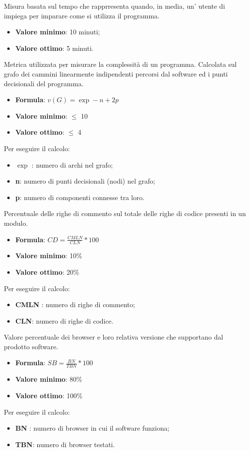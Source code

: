 Misura basata sul tempo che rapprresenta quando, in media, un' utente di impiega per imparare come si utilizza il programma.
\begin{itemize}
    \item \textbf{Valore minimo}: 10 minuti;
    \item \textbf{Valore ottimo}: 5 minuti.
\end{itemize}  

Metrica utilizzata per misurare la complessità di un programma. Calcolata sul grafo dei cammini linearmente indipendenti percorsi dal software ed i punti decisionali del programma.
\begin{itemize}
    \item \textbf{Formula}: $v(G)=\exp-n+2p$
    \item \textbf{Valore minimo}: $\leq$ 10
    \item \textbf{Valore ottimo}: $\leq$ 4
\end{itemize}  
Per eseguire il calcolo:
\begin{itemize}
    \item \textbf{$\exp$} : numero di archi nel grafo;
    \item \textbf{n}: numero di punti decisionali (nodi) nel grafo;
    \item \textbf{p}: numero di componenti connesse tra loro.
\end{itemize}

Percentuale delle righe di commento sul totale delle righe di codice presenti in un modulo.
\begin{itemize}
    \item \textbf{Formula}: $CD=\frac{CMLN}{CLN}*100$
    \item \textbf{Valore minimo}: 10\%
    \item \textbf{Valore ottimo}: 20\%
\end{itemize}  
Per eseguire il calcolo:
\begin{itemize}
    \item \textbf{CMLN} : numero di righe di commento;
    \item \textbf{CLN}: numero di righe di codice.
\end{itemize}

Valore percentuale dei browser e loro relativa versione che supportano dal prodotto software.
\begin{itemize}
    \item \textbf{Formula}: $SB=\frac{BN}{TBN}*100$
    \item \textbf{Valore minimo}: 80\%
    \item \textbf{Valore ottimo}: 100\%
\end{itemize}  
Per eseguire il calcolo:
\begin{itemize}
    \item \textbf{BN} : numero di browser in cui il software funziona;
    \item \textbf{TBN}: numero di browser testati.
\end{itemize}

